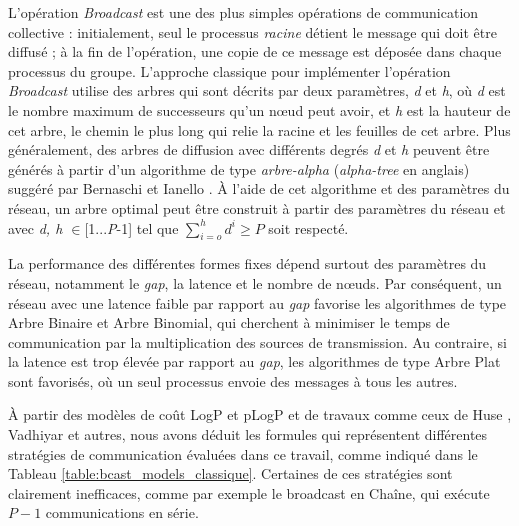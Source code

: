 L'opération \emph{Broadcast} est une des plus simples opérations de
communication collective : initialement, seul le processus \emph{racine}
détient le message qui doit être diffusé ; à la fin de l'opération,
une copie de ce message est déposée dans chaque processus du groupe.
L'approche classique pour implémenter l'opération \emph{Broadcast} utilise
des arbres qui sont décrits par deux paramètres, \emph{d} et \emph{h},
où \emph{d} est le nombre maximum de successeurs qu'un n{\oe}ud peut
avoir, et \emph{h} est la hauteur de cet arbre, le chemin le plus
long qui relie la racine et les feuilles de cet arbre. Plus généralement,
des arbres de diffusion avec différents degrés \emph{d} et \emph{h}
peuvent être générés à partir d'un algorithme de type \emph{arbre-alpha}
(\emph{alpha-tree} en anglais) suggéré par Bernaschi et Ianello \cite{Bernaschi98}.
À l'aide de cet algorithme et des paramètres du réseau, un arbre optimal
peut être construit à partir des paramètres du réseau et avec \emph{d,
	h $\in$}{[}1...\emph{P}-1] tel que $\sum_{i=o}^{h}d^{i}\geq P$ soit
respecté. %

La performance des différentes formes fixes dépend surtout des paramètres
du réseau, notamment le \emph{gap}, la latence et le nombre de n{\oe}uds.
Par conséquent, un réseau avec une latence faible par rapport au \emph{gap}
favorise les algorithmes de type Arbre Binaire et Arbre Binomial,
qui cherchent à minimiser le temps de communication par la multiplication
des sources de transmission. Au contraire, si la latence est trop
élevée par rapport au \emph{gap}, les algorithmes de type Arbre Plat
sont favorisés, où un seul processus envoie des messages à tous les
autres. 


À partir des modèles de coût LogP \cite{Culler96} et pLogP \cite{Kielmann01}
et de travaux comme ceux de Huse \cite{Huse99}, Vadhiyar \cite{Vadhiyar00}
et autres, nous avons déduit les formules qui représentent différentes
stratégies de communication évaluées dans ce travail, comme indiqué
dans le Tableau \ref{table:bcast_models_classique}. Certaines de
ces stratégies sont clairement inefficaces, comme par exemple le broadcast
en Chaîne, qui exécute $P-1$ communications en série. 

